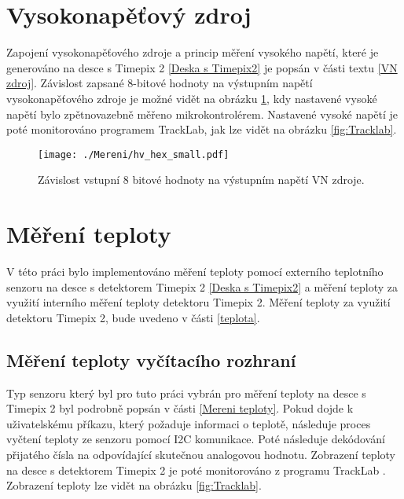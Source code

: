 \section{Vysokonapěťový zdroj}
Zapojení vysokonapěťového zdroje a princip měření vysokého napětí, které je generováno na desce s Timepix 2 \ref{Deska s Timepix2} je popsán v části textu \ref{VN zdroj}. Závislost zapsané 8-bitové hodnoty na výstupním napětí vysokonapěťového zdroje je možné vidět na obrázku \ref{fig:hv_hex}, kdy nastavené vysoké napětí bylo zpětnovazebně měřeno mikrokontrolérem. Nastavené vysoké napětí je poté monitorováno programem TrackLab, jak lze vidět na obrázku \ref{fig:Tracklab}.
\begin{figure}[h!]
	\centering
	\captionsetup{justification=centering}
	\texttt{[image: ./Mereni/hv\_hex\_small.pdf]}
	\caption{Závislost vstupní 8 bitové hodnoty na výstupním napětí VN zdroje.} 
	\label{fig:hv_hex}
\end{figure}


\section{Měření teploty}
V této práci bylo implementováno měření teploty pomocí externího teplotního senzoru na desce s detektorem Timepix 2 \ref{Deska s Timepix2} a měření teploty za využití interního měření teploty detektoru Timepix 2. Měření teploty za využití detektoru Timepix 2, bude uvedeno v části \ref{teplota}.
\subsection{Měření teploty vyčítacího rozhraní}
Typ senzoru který byl pro tuto práci vybrán pro měření teploty na desce s Timepix 2 byl podrobně popsán v části \ref{Mereni teploty}. Pokud dojde k uživatelskému příkazu, který požaduje informaci o teplotě, následuje proces vyčtení teploty ze senzoru pomocí I2C komunikace. Poté následuje dekódování přijatého čísla na odpovídající skutečnou analogovou hodnotu. Zobrazení teploty na desce s detektorem Timepix 2 je poté monitorováno z programu TrackLab \cite{Manek_2024}. Zobrazení teploty lze vidět na obrázku \ref{fig:Tracklab}.

